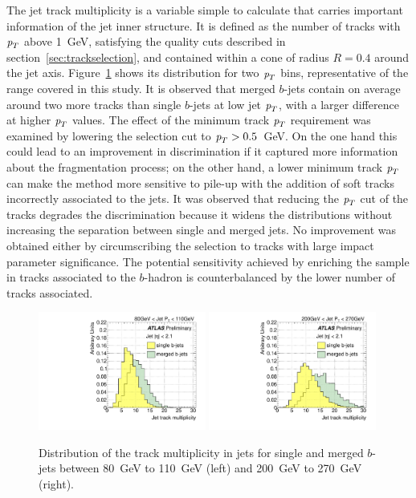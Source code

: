 The jet track multiplicity is a variable simple to calculate that carries important information of the jet inner structure. It is defined as the number of tracks with ${\emph{p}_{T}}$ above 1~GeV, satisfying the quality cuts described in section~\ref{sec:trackselection}, and contained within a cone of radius $R=0.4$ around the jet axis.  Figure~\ref{fig:ntrksinglemerged} shows its distribution for two ${\emph{p}_{T}}$ bins, representative of the range covered in this study.  It is observed that merged $b$-jets contain on average around two more tracks than single $b$-jets at low jet ${\emph{p}_{T}}$, with a larger difference at higher ${\emph{p}_{T}}$ values. 
The effect of the minimum track ${\emph{p}_{T}}$ requirement was examined by lowering the selection cut to ${\emph{p}_{T}} > 0.5$~GeV. On the one hand this could lead to an improvement in discrimination if it captured more information about the fragmentation process; on the other hand, a lower minimum track ${\emph{p}_{T}}$ can make the method more sensitive to pile-up with the addition of soft tracks incorrectly associated to the jets.
It was observed that reducing the ${\emph{p}_{T}}$ cut of the tracks degrades the discrimination because it widens the distributions without increasing the separation between single and merged jets. No improvement was obtained either by circumscribing the selection to tracks with large impact parameter significance. %
The potential sensitivity achieved by enriching the sample in tracks associated to the $b$-hadron is counterbalanced by the lower number of tracks associated.
\vspace{3 mm}
\begin{figure}[tp]
\centering
\includegraphics[width=0.49\textwidth]{FIGS/VarsSingleMerged/Ntrk080.pdf}
\includegraphics[width=0.49\textwidth]{FIGS/VarsSingleMerged/Ntrk200.pdf}
\caption{Distribution of the track multiplicity in jets for single and merged $b$-jets between 80~GeV to 110~GeV (left) and 200~GeV to 270~GeV (right).}
\label{fig:ntrksinglemerged}
\end{figure}


